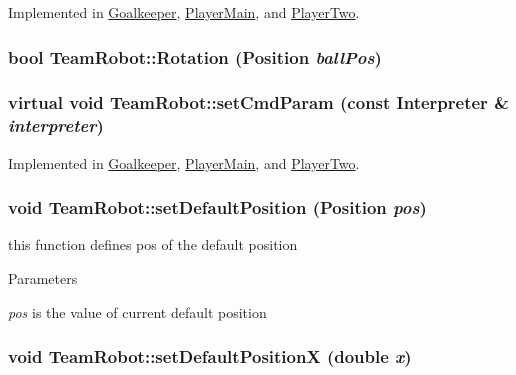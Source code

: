Implemented in \hyperlink{classGoalkeeper_ab850d0d2278730bebc5479f1a339a925}{Goalkeeper}, \hyperlink{classPlayerMain_af12a95c226ce973056681a138b55fb6c}{PlayerMain}, and \hyperlink{classPlayerTwo_a56d794b718c60092a324f312b8333eb9}{PlayerTwo}.

\hypertarget{classTeamRobot_aa1bb9ac05c067a68118c8646c8d71830}{
\subsubsection[{Rotation}]{\setlength{\rightskip}{0pt plus 5cm}bool TeamRobot::Rotation (Position {\em ballPos})}}
\label{classTeamRobot_aa1bb9ac05c067a68118c8646c8d71830}
\hypertarget{classTeamRobot_a34c0fd6986c510d4025e5752b3c0e49a}{
\subsubsection[{setCmdParam}]{\setlength{\rightskip}{0pt plus 5cm}virtual void TeamRobot::setCmdParam (const {\bf Interpreter} \& {\em interpreter})}}
\label{classTeamRobot_a34c0fd6986c510d4025e5752b3c0e49a}


Implemented in \hyperlink{classGoalkeeper_acfa6fbad0f6b1627fd59cc7cce6ff321}{Goalkeeper}, \hyperlink{classPlayerMain_a5c4af159392663660f91809052422945}{PlayerMain}, and \hyperlink{classPlayerTwo_aa0294cf24297f66ffd92f1a250794340}{PlayerTwo}.

\hypertarget{classTeamRobot_a322f046e260aedff6f2c8edc5730c9ac}{
\subsubsection[{setDefaultPosition}]{\setlength{\rightskip}{0pt plus 5cm}void TeamRobot::setDefaultPosition (Position {\em pos})}}
\label{classTeamRobot_a322f046e260aedff6f2c8edc5730c9ac}


this function defines pos of the default position 


\begin{DoxyParams}{Parameters}
\item[{\em pos}]is the value of current default position \end{DoxyParams}
\hypertarget{classTeamRobot_a527cefdb32f2bc0a4fa770207d4dc934}{
\subsubsection[{setDefaultPositionX}]{\setlength{\rightskip}{0pt plus 5cm}void TeamRobot::setDefaultPositionX (double {\em x})}}
\label{classTeamRobot_a527cefdb32f2bc0a4fa770207d4dc934}


